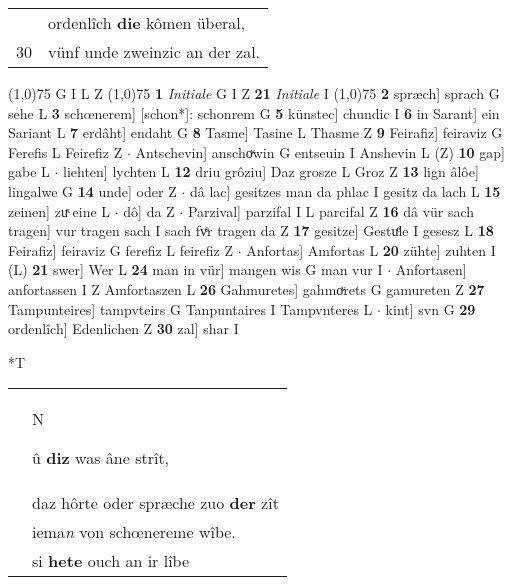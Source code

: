 \documentclass[8pt,a4paper,notitlepage]{article}
\begin{document}
\begin{table}[ht]
\begin{minipage}[t]{0.5\linewidth}
\begin{tabular}{rl}
 & ordenlîch \textbf{die} kômen überal,\\ 
30 & vünf unde zweinzic an der zal.\\ 
\end{tabular}
\scriptsize
\line(1,0){75} \newline
G I L Z \newline
\line(1,0){75} \newline
\textbf{1} \textit{Initiale} G I Z  \textbf{21} \textit{Initiale} I  \newline
\line(1,0){75} \newline
\textbf{2} spræch] sprach G sehe L \textbf{3} schœnerem] [schon*]: schonrem G \textbf{5} künstec] chundic I \textbf{6} in Sarant] ein Sariant L \textbf{7} erdâht] endaht G \textbf{8} Tasme] Tasine L Thasme Z \textbf{9} Feirafiz] feiraviz G Ferefis L Feirefiz Z  $\cdot$ Antschevin] anschoͮwin G entseuin I Anshevin L (Z) \textbf{10} gap] gabe L  $\cdot$ liehten] lychten L \textbf{12} driu grôziu] Daz grosze L Groz Z \textbf{13} lign âlôe] lingalwe G \textbf{14} unde] oder Z  $\cdot$ dâ lac] gesitzes man da phlac I gesitz da lach L \textbf{15} zeinen] zuͯ eine L  $\cdot$ dô] da Z  $\cdot$ Parzival] parzifal I L parcifal Z \textbf{16} dâ vür sach tragen] vur tragen sach I sach fvͤr tragen da Z \textbf{17} gesitze] Gestuͤle I gesesz L \textbf{18} Feirafiz] feiraviz G ferefiz L feirefiz Z  $\cdot$ Anfortas] Amfortas L \textbf{20} zühte] zuhten I (L) \textbf{21} swer] Wer L \textbf{24} man in vür] mangen wis G man vur I  $\cdot$ Anfortasen] anfortassen I Z Amfortaszen L \textbf{26} Gahmuretes] gahmoͮrets G gamureten Z \textbf{27} Tampunteires] tampvteirs G Tanpuntaires I Tampvnteres L  $\cdot$ kint] svn G \textbf{29} ordenlîch] Edenlichen Z \textbf{30} zal] shar I \newline
\end{minipage}
\hspace{0.5cm}
\begin{minipage}[t]{0.5\linewidth}
\small
\begin{center}*T
\end{center}
\begin{tabular}{rl}
 & \begin{large}N\end{large}û \textbf{diz} was âne strît,\\ 
 & daz hôrte oder spræche zuo \textbf{der} zît\\ 
 & iema\textit{n} von schœnereme wîbe.\\ 
 & si \textbf{hete} ouch an ir lîbe\\ 

\end{tabular}
\end{minipage}
\end{table}
\end{document}
